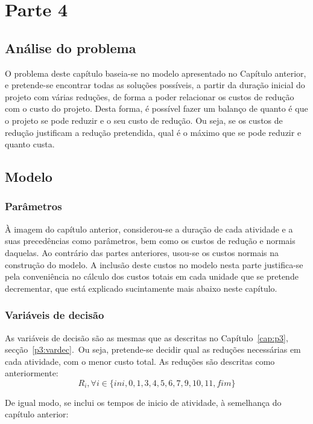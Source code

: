 \chapter{Parte 4}
\label{cap:p4}

\section{Análise do problema}

O problema deste capítulo baseia-se no modelo apresentado no Capítulo anterior,
e pretende-se encontrar todas as soluções possíveis, a partir da duração inicial
do projeto com várias reduções, de forma a poder relacionar os custos de redução
com o custo do projeto. Desta forma, é possível fazer um balanço de quanto é que
o projeto se pode reduzir e o seu custo de redução. Ou seja, se os custos de
redução justificam a redução pretendida, qual é o máximo que se pode reduzir
e quanto custa.

\section{Modelo}

\subsection{Parâmetros}

À imagem do capítulo anterior, considerou-se a duração de cada atividade
e a suas precedências como parâmetros, bem como os custos de redução e normais
daquelas. Ao contrário das partes anteriores, usou-se os custos normais na
construção do modelo. A inclusão deste custos no modelo nesta parte justifica-se
pela conveniência no cálculo dos custos totais em cada unidade que se pretende
decrementar, que está explicado sucintamente mais abaixo neste capítulo.

\subsection{Variáveis de decisão}

As variáveis de decisão são as mesmas que as descritas no Capítulo~\ref{cap:p3},
secção~\ref{p3:vardec}.\ Ou seja, pretende-se decidir qual as reduções
necessárias em cada atividade, com o menor custo total. As reduções são
descritas como anteriormente: 
$$R_i, \forall i \in \{ini, 0, 1, 3, 4,5,6,7,9,10,11,fim\}$$

De igual modo, se inclui os tempos de inicio de atividade, à semelhança do
capítulo anterior:

